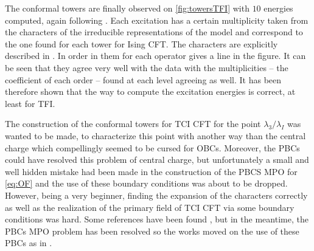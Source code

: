 	The conformal towers are finally observed on \autoref{fig:towersTFI} with $10$ energies computed, again following \cite{chepiga2017}. Each excitation has a certain multiplicity taken from the characters of the irreducible representations of the model \cite{cardy1986, cardy1989, francesco1997} and correspond to the one found for each tower for Ising CFT. The characters are explicitly described in \cite{chepiga2017}. In order in them for each operator gives a line in the figure. It can be seen that they agree very well with the data with the multiplicities -- the coefficient of each order -- found at each level agreeing as well. It has been therefore shown that the way to compute the excitation energies is correct, at least for TFI.

	The construction of the conformal towers for TCI CFT for the point $\lambda_3/\lambda_I$ was wanted to be made, to characterize this point with another way than the central charge  which compellingly seemed to be cursed for OBCs. Moreover, the PBCs could have resolved this problem of central charge, but unfortunately a small and well hidden mistake had been made in the construction of the PBCS MPO for \eqref{eq:OF} and the use of these boundary conditions was about to be dropped. However, being a very beginner, finding the expansion of the characters correctly as well as the realization of the primary field of TCI CFT via some boundary conditions was hard. Some references have been found \cite{affleck2000, belavin1984, cardy1986, cardy1989, friedan1985, friedan1984, lassig1991, qiu1986}, but in the meantime, the PBCs MPO problem has been resolved so the works moved on the use of these PBCs as in \cite{obrien2018}.

